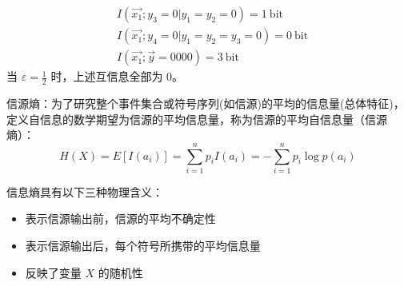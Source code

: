 \begin{remark}
\begin{solution}
\begin{enumerate}
\begin{align*}
                &I(\overrightarrow{x_1}; y_3 = 0 | y_1 = y_2 = 0) = \SI{1}{\mathrm{bit}}\\
                &I(\overrightarrow{x_1} ; y_4 = 0 | y_1 = y_2 = y_3 = 0) = \SI{0}{\mathrm{bit}}\\
                &I(\overrightarrow{x_1} ; \overrightarrow{y} = 0000) = \SI{3}{\mathrm{bit}}
            \end{align*}
            当 $\varepsilon = \frac{1}{2}$ 时，上述互信息全部为 0。
        \end{enumerate}
    \end{solution}
\end{remark}

\begin{remark}
    信源熵：为了研究整个事件集合或符号序列(如信源)的平均的信息量(总体特征)，定义自信息的数学期望为信源的平均信息量，称为信源的平均自信息量（信源熵）：\[H(X)=E\left[I\left(a_{i}\right)\right]=\sum_{i=1}^{n} p_{i} I\left(a_{i}\right)=-\sum_{i=1}^{n} p_{i} \log p\left(a_{i}\right)\]

    信息熵具有以下三种物理含义：
    \begin{itemize}
        \item 表示信源输出前，信源的平均不确定性
        \item 表示信源输出后，每个符号所携带的平均信息量
        \item 反映了变量 $X$ 的随机性
    \end{itemize}
\end{remark}

